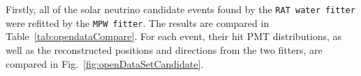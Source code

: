 Firstly, all of the solar neutrino candidate events found by the \texttt{RAT water fitter} were refitted by the \texttt{MPW fitter}. The results are compared in Table~\ref{tab:opendataCompare}. For each event, their hit PMT distributions, as well as the reconstructed positions and directions from the two fitters, are compared in Fig.~\ref{fig:openDataSetCandidate}. 

\begin{figure}[htbp]
	\centering
\end{figure}
